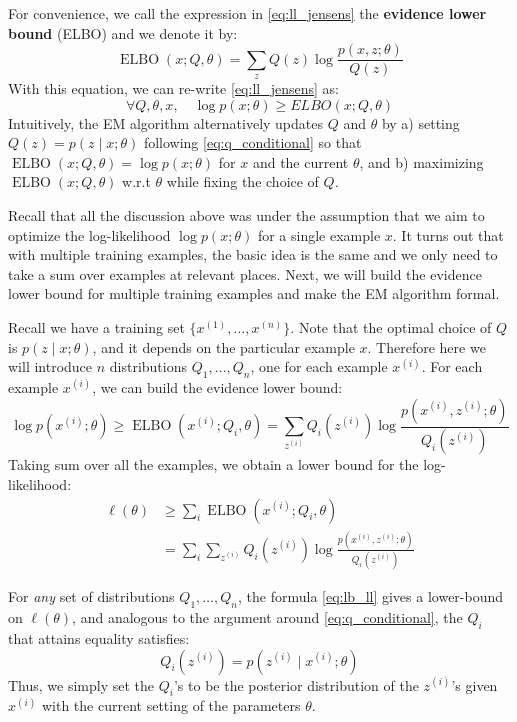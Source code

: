 For convenience, we call the expression in \cref{eq:ll_jensens} the \textbf{evidence
lower bound} (ELBO) and we denote it by:
\begin{equation}
    \operatorname{ELBO}(x;Q,\theta) = \sum_z Q(z) \log \frac{p(x,z;\theta)}{Q(z)}\label{eq:elbo}
\end{equation}
With this equation, we can re-write \cref{eq:ll_jensens} as:
\begin{equation}
    \forall Q,\theta,x, \quad \log p(x;\theta) \ge ELBO(x;Q,\theta)\label{eq:forall_elbo}
\end{equation}
Intuitively, the EM algorithm alternatively updates $Q$ and $\theta$ by a) setting
$Q(z) = p(z \mid x;\theta)$ following \cref{eq:q_conditional} so that $\operatorname{ELBO}(x;Q,\theta) = \log p(x;\theta)$
for $x$ and the current $\theta$, and b) maximizing $\operatorname{ELBO}(x;Q,\theta)$ w.r.t $\theta$ while fixing
the choice of $Q$.

Recall that all the discussion above was under the assumption that we
aim to optimize the log-likelihood $\log p(x;\theta)$ for a single example $x$. It turns
out that with multiple training examples, the basic idea is the same and we
only need to take a sum over examples at relevant places. Next, we will %
build the evidence lower bound for multiple training examples and make the
EM algorithm formal.

Recall we have a training set $\{x^{(1)} ,\ldots,x^{(n)} \}$. Note that the optimal choice
of $Q$ is $p(z \mid x;\theta)$, and it depends on the particular example $x$. Therefore here
we will introduce $n$ distributions $Q_1,\ldots,Q_n$, one for each example $x^{(i)}$. For
each example $x^{(i)}$, we can build the evidence lower bound:
\begin{equation*}
    \log p(x^{(i)} ;\theta) \ge \operatorname{ELBO}(x^{(i)} ;Q_i ,\theta) = \sum_{z^{(i)}} Q_i(z^{(i)})\log\frac{p(x^{(i)},z^{(i)} ;\theta)}{Q_i (z^{(i)})}
\end{equation*}
Taking sum over all the examples, we obtain a lower bound for the log-
likelihood:
\begin{align}
    \ell(\theta) &\ge \sum_{i} \operatorname{ELBO}(x^{(i)} ;Q_i ,\theta)\label{eq:lb_ll}\\
        &= \sum_{i} \sum_{z^{(i)}} Q_i(z^{(i)}) \log \frac{p(x^{(i)} ,z^{(i)} ;\theta)}{Q_i(z^{(i)})}    
\end{align}

For \textit{any} set of distributions $Q_1 ,\ldots,Q_n$, the formula \ref{eq:lb_ll} gives a
lower-bound on $\ell(\theta)$, and analogous to the argument around \cref{eq:q_conditional}, the $Q_i$
that attains equality satisfies:
\begin{equation*}
    Q_i(z^{(i)}) = p(z^{(i)} \mid x^{(i)} ;\theta)
\end{equation*}
Thus, we simply set the $Q_i$'s to be the posterior distribution of the $z^{(i)}$'s
given $x^{(i)}$ with the current setting of the parameters $\theta$.

